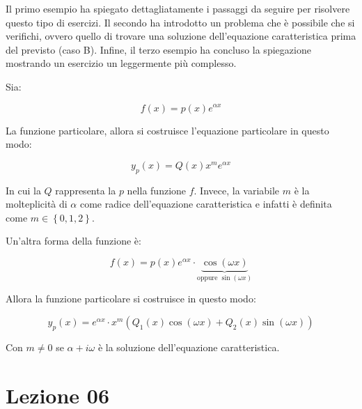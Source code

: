 \documentclass[a4paper]{article}
\begin{document}
	Il primo esempio ha spiegato dettagliatamente i passaggi da seguire per risolvere questo tipo di esercizi. Il secondo ha introdotto un problema che è possibile che si verifichi, ovvero quello di trovare una soluzione dell'equazione caratteristica prima del previsto (caso B). Infine, il terzo esempio ha concluso la spiegazione mostrando un esercizio un leggermente più complesso.\newline
	
	\noindent
	Sia:
	
	\begin{equation*}
		f\left(x\right) = p\left(x\right) e^{\alpha x}
	\end{equation*}
	
	\noindent
	La funzione particolare, allora si costruisce l'equazione particolare in questo modo:
	
	\begin{equation*}
		y_{p}\left(x\right) = Q\left(x\right) x^{m} e^{\alpha x}
	\end{equation*}

	\noindent
	In cui la $Q$ rappresenta la $p$ nella funzione $f$. Invece, la variabile $m$ è la molteplicità di $\alpha$ come radice dell'equazione caratteristica e infatti è definita come $m\in\left\{0,1,2\right\}$.\newline
	
	\noindent
	Un'altra forma della funzione è:
	
	\begin{equation*}
		f\left(x\right) = p\left(x\right) e^{\alpha x} \cdot \underbrace{\cos\left(\omega x\right)}_{\text{oppure } \sin\left(\omega x\right)}
	\end{equation*}
	
	\noindent
	Allora la funzione particolare si costruisce in questo modo:
	
	\begin{equation*}
		y_{p}\left(x\right) = e^{\alpha x} \cdot x^{m} \left(Q_{1}\left(x\right)\cos\left(\omega x\right) + Q_{2}\left(x\right)\sin\left(\omega x\right)\right)
	\end{equation*}

	\noindent
	Con $m \ne 0$ se $\alpha + i \omega$ è la soluzione dell'equazione caratteristica.
	
	\newpage
	
	\section{Lezione 06}
\end{document}
